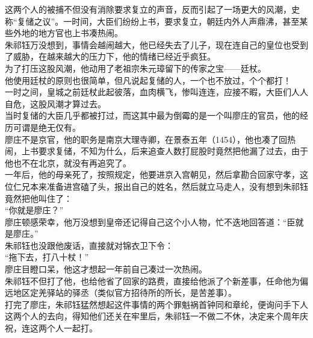 \begin{multicols}{\theparacolNo}
这两个人的被捕不但没有消除要求复立的声音，反而引起了一场更大的风潮，史称“复储之议”。一时间，大臣们纷纷上书，要求复立，朝廷内外人声鼎沸，甚至某些外地的地方官也上书凑热闹。\\

朱祁钰万没想到，事情会越闹越大，他已经失去了儿子，现在连自己的皇位也受到了威胁，在越来越大的压力下，他的情绪已经近乎疯狂。\\

为了打压这股风潮，他动用了老祖宗朱元璋留下的传家之宝——廷杖。\\

他使用廷杖的原则也很简单，但凡说起复储的人，一个也不放过，个个都打！\\

一时之间，皇城之前廷杖此起彼落，血肉横飞，惨叫连连，应接不暇，大臣们人人自危，这股风潮才算过去。\\

当时复储的大臣几乎都被打过，而这其中最为倒霉的是一个叫廖庄的官员，他的经历可谓是绝无仅有。\\

廖庄不是京官，他的职务是南京大理寺卿，在景泰五年（1454），他也凑了回热闹，上书要求复储，不知为什么，后来追查人数打屁股时竟然把他漏了过去，由于他也不在北京，就没有再追究了。\\

一年后，他的母亲死了，按照规定，他要进京入宫朝见，然后拿勘合回家守孝，这位仁兄本来准备进宫磕了头，报出自己的姓名，然后就立马走人，没有想到朱祁钰竟然把他叫住了：\\

“你就是廖庄？”\\

廖庄顿感荣幸，他万没想到皇帝还记得自己这个小人物，忙不迭地回答道：“臣就是廖庄。”\\

朱祁钰也没跟他废话，直接就对锦衣卫下令：\\

“拖下去，打八十杖！”\\

廖庄目瞪口呆，他这才想起一年前自己凑过一次热闹。\\

朱祁钰不但打了他，也给他省了回家的路费，直接给他派了个新差事，任命他为偏远地区定羌驿站的驿丞（类似官方招待所的所长，是苦差事）。\\

打完了廖庄，朱祁钰猛然想起这件事情的两个罪魁祸首钟同和章纶，便询问手下人这两个人的去向，得知他们还关在牢里后，朱祁钰一不做二不休，决定来个周年庆祝，连这两个人一起打。\\


\end{multicols}
